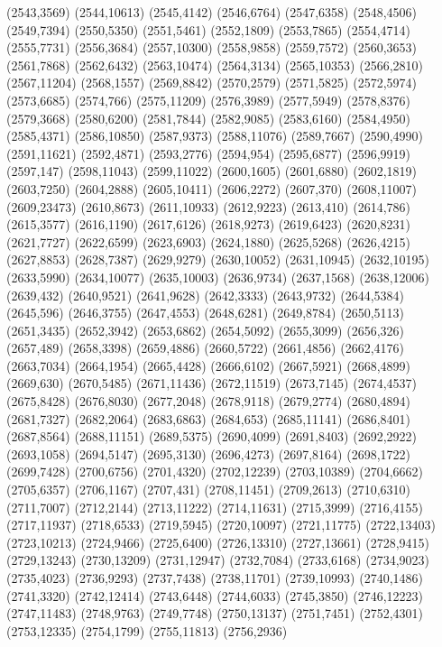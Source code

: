 (2543,3569)
(2544,10613)
(2545,4142)
(2546,6764)
(2547,6358)
(2548,4506)
(2549,7394)
(2550,5350)
(2551,5461)
(2552,1809)
(2553,7865)
(2554,4714)
(2555,7731)
(2556,3684)
(2557,10300)
(2558,9858)
(2559,7572)
(2560,3653)
(2561,7868)
(2562,6432)
(2563,10474)
(2564,3134)
(2565,10353)
(2566,2810)
(2567,11204)
(2568,1557)
(2569,8842)
(2570,2579)
(2571,5825)
(2572,5974)
(2573,6685)
(2574,766)
(2575,11209)
(2576,3989)
(2577,5949)
(2578,8376)
(2579,3668)
(2580,6200)
(2581,7844)
(2582,9085)
(2583,6160)
(2584,4950)
(2585,4371)
(2586,10850)
(2587,9373)
(2588,11076)
(2589,7667)
(2590,4990)
(2591,11621)
(2592,4871)
(2593,2776)
(2594,954)
(2595,6877)
(2596,9919)
(2597,147)
(2598,11043)
(2599,11022)
(2600,1605)
(2601,6880)
(2602,1819)
(2603,7250)
(2604,2888)
(2605,10411)
(2606,2272)
(2607,370)
(2608,11007)
(2609,23473)
(2610,8673)
(2611,10933)
(2612,9223)
(2613,410)
(2614,786)
(2615,3577)
(2616,1190)
(2617,6126)
(2618,9273)
(2619,6423)
(2620,8231)
(2621,7727)
(2622,6599)
(2623,6903)
(2624,1880)
(2625,5268)
(2626,4215)
(2627,8853)
(2628,7387)
(2629,9279)
(2630,10052)
(2631,10945)
(2632,10195)
(2633,5990)
(2634,10077)
(2635,10003)
(2636,9734)
(2637,1568)
(2638,12006)
(2639,432)
(2640,9521)
(2641,9628)
(2642,3333)
(2643,9732)
(2644,5384)
(2645,596)
(2646,3755)
(2647,4553)
(2648,6281)
(2649,8784)
(2650,5113)
(2651,3435)
(2652,3942)
(2653,6862)
(2654,5092)
(2655,3099)
(2656,326)
(2657,489)
(2658,3398)
(2659,4886)
(2660,5722)
(2661,4856)
(2662,4176)
(2663,7034)
(2664,1954)
(2665,4428)
(2666,6102)
(2667,5921)
(2668,4899)
(2669,630)
(2670,5485)
(2671,11436)
(2672,11519)
(2673,7145)
(2674,4537)
(2675,8428)
(2676,8030)
(2677,2048)
(2678,9118)
(2679,2774)
(2680,4894)
(2681,7327)
(2682,2064)
(2683,6863)
(2684,653)
(2685,11141)
(2686,8401)
(2687,8564)
(2688,11151)
(2689,5375)
(2690,4099)
(2691,8403)
(2692,2922)
(2693,1058)
(2694,5147)
(2695,3130)
(2696,4273)
(2697,8164)
(2698,1722)
(2699,7428)
(2700,6756)
(2701,4320)
(2702,12239)
(2703,10389)
(2704,6662)
(2705,6357)
(2706,1167)
(2707,431)
(2708,11451)
(2709,2613)
(2710,6310)
(2711,7007)
(2712,2144)
(2713,11222)
(2714,11631)
(2715,3999)
(2716,4155)
(2717,11937)
(2718,6533)
(2719,5945)
(2720,10097)
(2721,11775)
(2722,13403)
(2723,10213)
(2724,9466)
(2725,6400)
(2726,13310)
(2727,13661)
(2728,9415)
(2729,13243)
(2730,13209)
(2731,12947)
(2732,7084)
(2733,6168)
(2734,9023)
(2735,4023)
(2736,9293)
(2737,7438)
(2738,11701)
(2739,10993)
(2740,1486)
(2741,3320)
(2742,12414)
(2743,6448)
(2744,6033)
(2745,3850)
(2746,12223)
(2747,11483)
(2748,9763)
(2749,7748)
(2750,13137)
(2751,7451)
(2752,4301)
(2753,12335)
(2754,1799)
(2755,11813)
(2756,2936)
